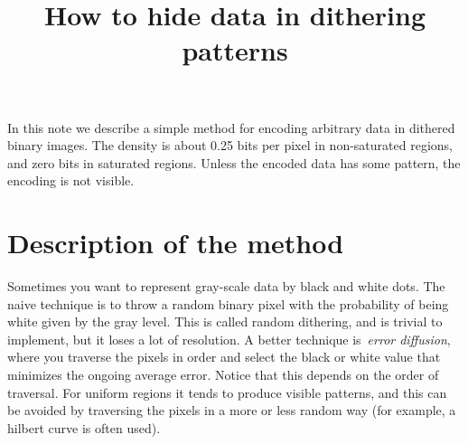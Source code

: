 \title{How to hide data in dithering patterns}

In this note we describe a simple method for encoding arbitrary data in
dithered binary images.
The density is about 0.25 bits per pixel in non-saturated
regions, and zero bits in saturated regions.
Unless the encoded data has some pattern, the encoding is not visible.

\section{Description of the method}

Sometimes you want to represent gray-scale data by black and white dots.  The
naive technique is to throw a random binary pixel with the probability of
being white given by the gray level.  This is called random dithering, and is
trivial to implement, but it loses a lot of resolution.  A better technique
is~\emph{error diffusion}, where you traverse the pixels in order and select
the black or white value that minimizes the ongoing average error.  Notice
that this depends on the order of traversal.  For uniform regions it tends to
produce visible patterns, and this can be avoided by traversing the pixels in
a more or less random way (for example, a hilbert curve is often used).


